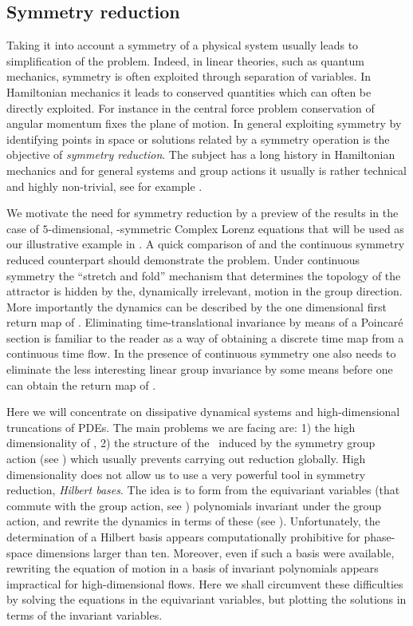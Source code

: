 \subsection{Symmetry reduction}

Taking it into account  a symmetry of a physical system
usually leads to simplification of the problem.
Indeed, in linear theories, such as quantum mechanics, symmetry is often exploited
through separation of variables. In Hamiltonian mechanics it leads to conserved quantities which can often be
directly exploited. For instance in the central force problem conservation of angular momentum fixes the plane
of motion.
In general exploiting symmetry by identifying points in space or solutions
related by a symmetry operation is the objective of
\emph{symmetry reduction}. The subject has a long history in Hamiltonian mechanics and for general systems
and group actions it usually is rather technical and highly non-trivial, see for example
.

We motivate the need for symmetry reduction by a preview of the results in the case of $5$-dimensional,
-symmetric Complex Lorenz equations that will be used as our illustrative example in .
 A quick comparison of
 and the continuous symmetry reduced  counterpart should demonstrate the problem.
Under continuous symmetry the ``stretch and fold'' mechanism that determines the topology of the attractor
is hidden by the, dynamically irrelevant, motion in the group direction. More importantly the dynamics can
be described by the one dimensional first return map of . Eliminating time-translational
invariance by means of a Poincar\'e section is familiar to the reader as a way of obtaining a discrete time map from
a continuous time flow. In the presence of continuous symmetry one also needs to eliminate the less interesting
linear group invariance by some means before one can obtain the return map of .

Here we will concentrate on dissipative dynamical systems and high-dimensional truncations
of PDEs. The main problems we are facing are: 1) the high dimensionality of \statesp, 2) the structure of
the \statesp\ induced by the symmetry group action (see )
which usually prevents carrying out reduction globally.
High dimensionality does not allow us to use a very powerful
tool in symmetry reduction, \emph{Hilbert bases}.
The idea is to form from the equivariant variables
(that commute
with the group action, see )
polynomials invariant under the group action, and rewrite the
dynamics in terms of these (see ).
Unfortunately, the determination of a Hilbert basis appears
computationally prohibitive for phase-space dimensions
larger than ten. Moreover, even
if such a basis were available, rewriting the equation of
motion in a basis of invariant polynomials appears
impractical for high-dimensional flows.
Here we shall circumvent these difficulties by solving the
equations in the equivariant variables, but plotting the
solutions in terms of the invariant variables.

